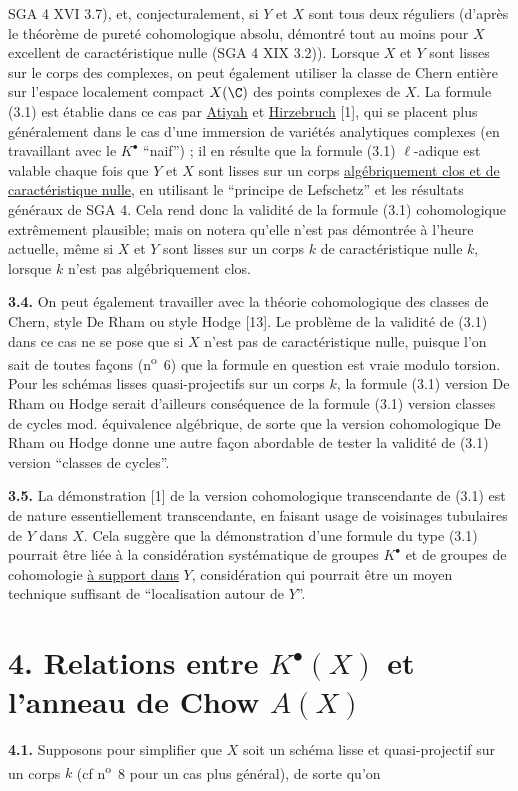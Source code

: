 
SGA 4 XVI 3.7), et,
conjecturalement, si $Y$ et $X$ sont tous deux réguliers (d'après le théorème de pureté cohomologique absolu, démontré tout au moins pour $X$ excellent de caractéristique nulle (SGA 4 XIX 3.2)). Lorsque $X$ et $Y$ sont lisses sur le corps des complexes, on peut également utiliser la classe de Chern entière sur l'espace localement compact $X(\C)$ des points complexes de $X$. La formule (3.1) est établie dans ce cas par \uline{Atiyah} et \uline{Hirzebruch} [1], qui se placent plus généralement dans le cas d'une immersion de variétés analytiques complexes (en travaillant avec le $K^\bullet$ ``naif'') ; il en résulte que la formule (3.1) $\ell$-adique est valable chaque fois que $Y$ et $X$ sont lisses sur un corps \uline{algébriquement clos et de caractéristique nulle}, en utilisant le ``principe de Lefschetz'' et les résultats généraux de SGA 4. Cela rend donc la validité de la formule (3.1) cohomologique extrêmement plausible; mais on notera qu'elle n'est pas démontrée à l'heure actuelle, même si $X$ et $Y$ sont lisses sur un corps $k$ de caractéristique nulle $k$, lorsque $k$ n'est pas algébriquement clos.

\textbf{3.4.} On peut également travailler avec la théorie cohomologique des classes de Chern, style De Rham ou style Hodge [13]. Le problème de la validité de (3.1) dans ce cas ne se pose que si $X$ n'est pas de caractéristique nulle, puisque l'on sait de toutes façons (n\textsuperscript{o}~6) que la formule en question est vraie modulo torsion. Pour les schémas lisses quasi-projectifs sur un corps $k$, la formule (3.1) version De Rham ou Hodge serait d'ailleurs conséquence de la formule (3.1) version classes de cycles mod. équivalence algébrique, de sorte que la version cohomologique De Rham ou Hodge donne une autre façon abordable de tester la validité de (3.1) version ``classes de cycles''.

\textbf{3.5.} La démonstration [1] de la version cohomologique transcendante de (3.1) est de nature essentiellement transcendante, en faisant usage de voisinages tubulaires de $Y$ dans $X$. Cela suggère que la démonstration d'une formule du type (3.1) pourrait être liée à la considération systématique de groupes $K^\bullet$ et de groupes de cohomologie \uline{à support dans} $Y$, considération qui pourrait être un moyen technique suffisant de ``localisation autour de $Y$''.

\section*{4. Relations entre $K^\bullet(X)$ et l'anneau de Chow $A(X)$}

\textbf{4.1.} Supposons pour simplifier que $X$ soit un schéma lisse et quasi-projectif sur un corps $k$ (cf n\textsuperscript{o}~8 pour un cas plus général), de sorte qu'on
